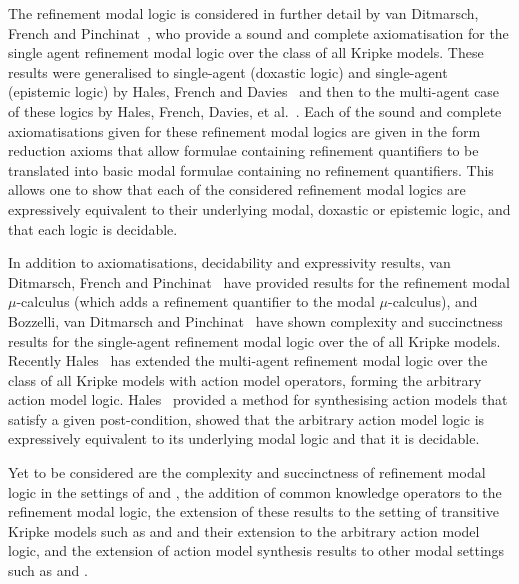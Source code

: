 The refinement modal logic is considered in further detail by van Ditmarsch,
French and Pinchinat~\cite{vanditmarsch:2010}, who provide a sound and complete
axiomatisation for the single agent refinement modal logic over the class
\classK{} of all Kripke models. These results were generalised to single-agent
\classKD{} (doxastic logic) and single-agent \classS{} (epistemic logic) by
Hales, French and Davies~\cite{hales:2011a} and then to the multi-agent case of
these logics by Hales, French, Davies, et al.~\cite{hales:2011b, hales:2012,
bozzelli:2014b}. Each of the sound and complete axiomatisations given for these
refinement modal logics are given in the form reduction axioms that allow
formulae containing refinement quantifiers to be translated into basic modal
formulae containing no refinement quantifiers. This allows one to show that each
of the considered refinement modal logics are expressively equivalent to their
underlying modal, doxastic or epistemic logic, and that each logic is decidable.

In addition to axiomatisations, decidability and expressivity results, van
Ditmarsch, French and Pinchinat~\cite{vanditmarsch:2010} have provided results
for the refinement modal $\mu$-calculus (which adds a refinement quantifier to
the modal $\mu$-calculus), and Bozzelli, van Ditmarsch and
Pinchinat~\cite{bozzelli:2014a} have shown complexity and succinctness results
for the single-agent refinement modal logic over the \classK{} of all Kripke
models.  Recently Hales~\cite{hales:2013} has extended the multi-agent
refinement modal logic over the class \classK{} of all Kripke models with
action model operators, forming the arbitrary action model logic.
Hales~\cite{hales:2013} provided a method for synthesising action models that
satisfy a given post-condition, showed that the arbitrary action model logic is
expressively equivalent to its underlying modal logic and that it is decidable.

Yet to be considered are the complexity and succinctness of refinement modal
logic in the settings of \classKD{} and \classS{}, the addition of common
knowledge operators to the refinement modal logic, the extension of these
results to the setting of transitive Kripke models such as \classKF{} and
\classSF{} and their extension to the arbitrary action model logic, and the
extension of action model synthesis results to other modal settings such as
\classKD{} and \classS{}.
